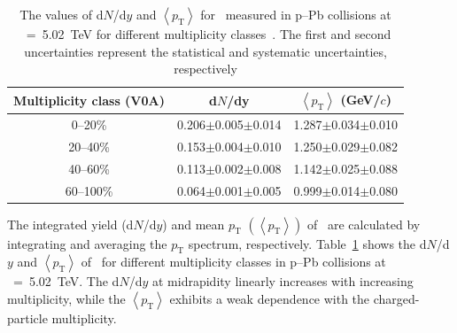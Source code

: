\begin{table}[h!]
\caption{The values of d$N$/d$y$ and $\left\langle p_{\mathrm{T}} \right\rangle$ for \fzero~measured in p--Pb collisions at \snn~=~5.02~TeV for different multiplicity classes~\cite{ALICE:2012xs}. The first and second uncertainties represent the statistical and systematic uncertainties, respectively}
\centering
\begin{tabular}{ccc}
\hline 
Multiplicity class (V0A) & d$N$/dy & $\left\langle p_{\mathrm{T}} \right\rangle$ (GeV/$c$) \\ \hline
0--20\% & 0.206$\pm$0.005$\pm$0.014 & 1.287$\pm$0.034$\pm$0.010 \\
20--40\% & 0.153$\pm$0.004$\pm$0.010 & 1.250$\pm$0.029$\pm$0.082 \\
40--60\% & 0.113$\pm$0.002$\pm$0.008 & 1.142$\pm$0.025$\pm$0.088 \\
60--100\% & 0.064$\pm$0.001$\pm$0.005 & 0.999$\pm$0.014$\pm$0.080 \\
\hline
\end{tabular}
\label{tab:ymp}
\end{table}

The integrated yield (d$N$/d$y$) and mean $p_{\mathrm{T}}$ $\left( \left\langle p_{\mathrm{T}} \right\rangle \right)$ of \fzero~are calculated by integrating and averaging the $p_{\mathrm{T}}$ spectrum, respectively. Table~\ref{tab:ymp} shows the d$N$/d$y$ and $ \left\langle p_{\mathrm{T}} \right\rangle$ of \fzero~for different multiplicity classes in p--Pb collisions at \snn~=~5.02~TeV. The d$N$/d$y$ at midrapidity linearly increases with increasing multiplicity, while the $\left\langle p_{\mathrm{T}} \right\rangle$ exhibits a weak dependence with the charged-particle multiplicity. 

